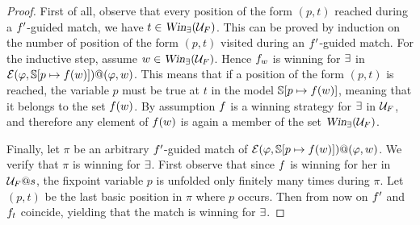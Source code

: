 \begin{proof}
First of all, observe that every position of the form $(p,t)$ reached during
a $f'$-guided match, we have $t \in \text{\sl Win}_{\exists}(\mathcal{U}_{F})$. 
This can be proved by induction on the number of position of the form $(p,t)$
visited during an $f'$-guided match. 
For the inductive step, assume $w \in \text{\sl Win}_{\exists}(\mathcal{U}_{F})$. 
Hence $f_w$ is winning for $\exists$ in  $\mathcal{E}(\varphi,\mathbb{S}[p \mapsto 
  f(w)])@(\varphi,w)$. 
This means that if a position of the form $(p, t)$ is reached, the variable $p$ 
must be true at $t$ in the model $\mathbb{S}[p \mapsto f(w)]$, meaning that it
belongs to the set $f(w)$.
By assumption $f$ is a winning strategy for $\exists$ in $\mathcal{U}_F$, and 
therefore any element of $f(w)$ is again a member of the set 
$\text{\sl Win}_{\exists}(\mathcal{U}_{F})$. 

Finally, let $\pi$ be an arbitrary $f'$-guided match of $\mathcal{E}(\varphi,
\mathbb{S}[p \mapsto f(w)])@(\varphi,w)$. 
We verify that $\pi$ is winning for $\exists$. 
First observe that since $f$ is winning for her in $\mathcal{U}_F@s$, the fixpoint 
variable $p$ is unfolded only finitely many times during $\pi$. 
Let $(p,t)$ be the last basic position in $\pi$ where $p$ occurs. 
Then from now on $f'$ and $f_t$ coincide, yielding  that the match is 
winning for $\exists$. 


\end{proof}
